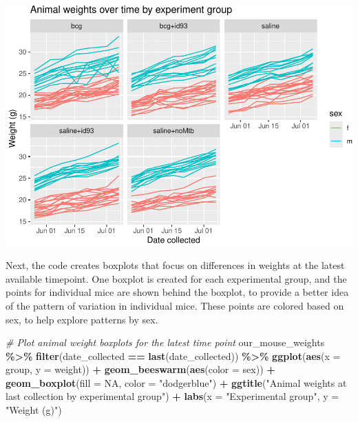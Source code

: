 \documentclass[
]{book}
\newenvironment{Shaded}{\begin{snugshade}}{\end{snugshade}}
\newcommand{\AttributeTok}[1]{\textcolor[rgb]{0.13,0.29,0.53}{#1}}
\newcommand{\CommentTok}[1]{\textcolor[rgb]{0.56,0.35,0.01}{\textit{#1}}}
\newcommand{\ConstantTok}[1]{\textcolor[rgb]{0.56,0.35,0.01}{#1}}
\newcommand{\FunctionTok}[1]{\textcolor[rgb]{0.13,0.29,0.53}{\textbf{#1}}}
\newcommand{\NormalTok}[1]{#1}
\newcommand{\SpecialCharTok}[1]{\textcolor[rgb]{0.81,0.36,0.00}{\textbf{#1}}}
\newcommand{\StringTok}[1]{\textcolor[rgb]{0.31,0.60,0.02}{#1}}
\begin{document}
\includegraphics{csu-impactb_files/figure-latex/unnamed-chunk-15-1.pdf}

Next, the code creates boxplots that focus on differences in weights at the
latest available timepoint. One boxplot is created for each experimental
group, and the points for individual mice are shown behind the boxplot, to
provide a better idea of the pattern of variation in individual mice. These
points are colored based on sex, to help explore patterns by sex.

\begin{Shaded}
\begin{Highlighting}[]
\CommentTok{\# Plot animal weight boxplots for the latest time point }
\NormalTok{our\_mouse\_weights }\SpecialCharTok{\%\textgreater{}\%} 
  \FunctionTok{filter}\NormalTok{(date\_collected }\SpecialCharTok{==} \FunctionTok{last}\NormalTok{(date\_collected)) }\SpecialCharTok{\%\textgreater{}\%} 
  \FunctionTok{ggplot}\NormalTok{(}\FunctionTok{aes}\NormalTok{(}\AttributeTok{x =}\NormalTok{ group, }\AttributeTok{y =}\NormalTok{ weight)) }\SpecialCharTok{+} 
  \FunctionTok{geom\_beeswarm}\NormalTok{(}\FunctionTok{aes}\NormalTok{(}\AttributeTok{color =}\NormalTok{ sex)) }\SpecialCharTok{+} 
  \FunctionTok{geom\_boxplot}\NormalTok{(}\AttributeTok{fill =} \ConstantTok{NA}\NormalTok{, }\AttributeTok{color =} \StringTok{"dodgerblue"}\NormalTok{) }\SpecialCharTok{+} 
  \FunctionTok{ggtitle}\NormalTok{(}\StringTok{"Animal weights at last collection by experimental group"}\NormalTok{) }\SpecialCharTok{+} 
  \FunctionTok{labs}\NormalTok{(}\AttributeTok{x =} \StringTok{"Experimental group"}\NormalTok{, }
       \AttributeTok{y =} \StringTok{"Weight (g)"}\NormalTok{)}
\end{Highlighting}
\end{Shaded}
\end{document}
